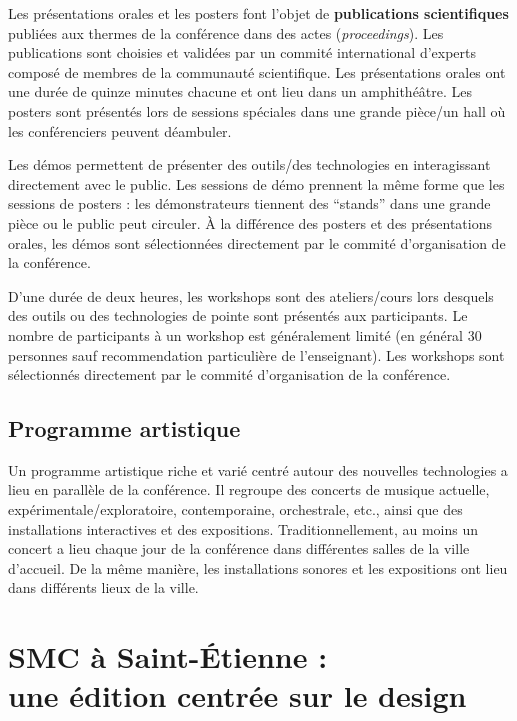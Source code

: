 \documentclass[fontsize=12pt]{scrartcl} %
\numberwithin{equation}{section} %
\numberwithin{figure}{section} %
\numberwithin{table}{section} %
\begin{document}
Les présentations orales et les posters font l'objet de \textbf{publications scientifiques} publiées aux thermes de la conférence dans des actes (\textit{proceedings}). Les publications sont choisies et validées par un commité international d'experts composé de membres de la communauté scientifique. Les présentations orales ont une durée de quinze minutes chacune et ont lieu dans un amphithéâtre. Les posters sont présentés lors de sessions spéciales dans une grande pièce/un hall où les conférenciers peuvent déambuler. 

Les démos permettent de présenter des outils/des technologies en interagissant directement avec le public. Les sessions de démo prennent la même forme que les sessions de posters : les démonstrateurs tiennent des ``stands'' dans une grande pièce ou le public peut circuler. À la différence des posters et des présentations orales, les démos sont sélectionnées directement par le commité d'organisation de la conférence.

D'une durée de deux heures, les workshops sont des ateliers/cours lors desquels des outils ou des technologies de pointe sont présentés aux participants. Le nombre de participants à un workshop est généralement limité (en général 30 personnes sauf recommendation particulière de l'enseignant). Les workshops sont sélectionnés directement par le commité d'organisation de la conférence.

\subsection{Programme artistique} 

Un programme artistique riche et varié centré autour des nouvelles technologies a lieu en parallèle de la conférence. Il regroupe des concerts de musique actuelle, expérimentale/exploratoire, contemporaine, orchestrale, etc., ainsi que des installations interactives et des expositions. Traditionnellement, au moins un concert a lieu chaque jour de la conférence dans différentes salles de la ville d'accueil. De la même manière, les installations sonores et les expositions ont lieu dans différents lieux de la ville.

\section{SMC à Saint-Étienne :\\une édition centrée sur le design}
\end{document}
